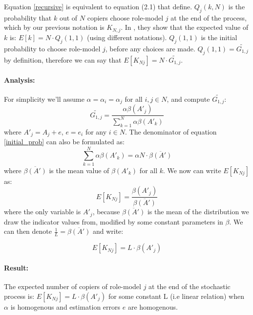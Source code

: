 \documentclass[11pt]{article}
\begin{document}
Equation \ref{recursive} is equivalent to equation (2.1) that \citet{GBD} define.
$Q_j(k,N)$ is the probability that $k$ out of $N$ copiers choose role-model $j$ at the end of the process, which by our previous notation is $K_{N,j}$.
In \citep[Eq. 2.3]{GBD}, they show that the expected value of $k$ is: $E[k] = N \cdot Q_j(1,1)$ (using different notations).
$Q_j(1,1)$ is the initial probability to choose role-model $j$, before any choices are made.
$Q_j(1,1) = \widetilde{G_{1,j}}$ by definition, therefore we can say that $E[K_{Nj}]=N \cdot\widetilde{G_{1,j}}$.\\

\paragraph{Analysis: } 
For simplicity we'll assume $\alpha = \alpha_i=\alpha_j$ for all $i,j \in N$, and compute $\widetilde{G_{1,j}}$:
\begin{equation}\label{initial_prob}
\widetilde{G_{1,j}} = \frac{\alpha\beta(A'_j)}{\sum\limits_{k=1}^{N}\alpha\beta(A'_k)}
\end{equation}
where $A'_j = A_j + e$, $e=e_i$ for any $i \in N$.
The denominator of equation \ref{initial_prob} can also be formulated as:
\begin{equation}
 \sum\limits_{k=1}^{N}\alpha\beta(A'_k) = \alpha N \cdot \overline{\beta(A')}
\end{equation}
where $\overline{\beta(A')}$ is the mean value of $\beta(A'_k)$ for all $k$.
We now can write $E[K_{Nj}]$ as:
\begin{equation}
E[K_{Nj}] = \frac{\beta(A'_j)}{\overline{\beta(A')}}
\end{equation}
where the only variable is $A'_j$, because $\overline{\beta(A')}$ is the mean of the distribution we draw the indicator values from, modified by some constant parameters in $\beta$.
We can then denote $\frac{1}{L} = \overline{\beta(A')}$ and write:

\begin{equation}\label{linearEq}
E[K_{Nj}] = L\cdot \beta(A'_j)
\end{equation}

\paragraph{Result: } The expected number of copiers of role-model $j$ at the end of the stochastic process is: $E[K_{Nj}] = L\cdot \beta(A'_j)$ for some constant L (i.e linear relation) when $\alpha$ is homogenous and estimation errors $e$ are homogenous.
\end{document}
